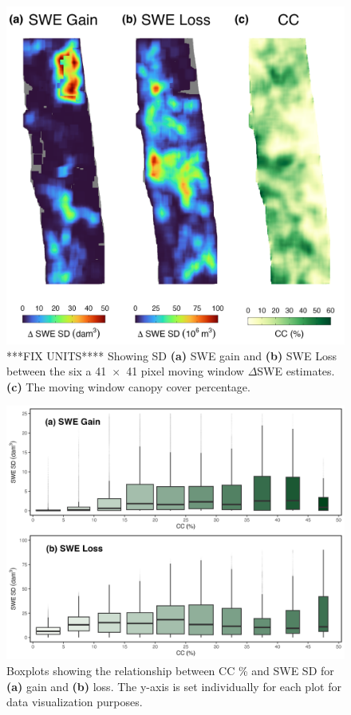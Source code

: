 \clearpage
\begin{figure}[t]
\centering
\includegraphics[width=\textwidth]{figures/ch4_figs/sd_vs_cc_map_dam3_41x41.png}
\caption{***FIX UNITS**** Showing SD \textbf{(a)} SWE gain and \textbf{(b)} SWE Loss between the six a 41~$\times$~41 pixel moving window $\Delta$SWE estimates. \textbf{(c)} The moving window canopy cover percentage.}
\label{fig:dswe_standard_deviation}
\end{figure}

\clearpage
\begin{figure}[t]
\centering
\includegraphics[width=\textwidth]{figures/ch4_figs/swe_sd_bp_dam3_41x41_v1.png}
\caption{Boxplots showing the relationship between CC \% and SWE SD for \textbf{(a)} gain and \textbf{(b)} loss. The y-axis is set individually for each plot for data visualization purposes.}
\label{fig:dswe_boxplots}
\end{figure}

